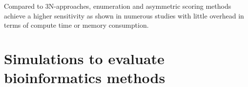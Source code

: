 \begin{table}[!ht]
\begin{center}
\begin{footnotesize}
\noindent{}
\end{footnotesize}
\end{center}
\caption[Asymmetric scoring matrix for bisulfite conversions as implemented in BiSS]{\textbf{Asymmetric scoring matrix for bisulfite conversions as implemented in BiSS.} In addition to base identity treated as a match with a score of 4, also C$>$T and G$>$A (reverse complement C$>$T) are treated as matches with a score of 4 since these conversion occur during bisulfite treatment. All other combinations are treated as mismatches and penalized with -2.}
\label{tab:bissscoring}
\end{table}

Compared to 3N-approaches, enumeration and asymmetric scoring methods achieve a higher sensitivity as shown in numerous studies \citep{Chatterjee2012,Harris2010,Zhang2021,Dinh2012AdvancedArabidopsis} with little overhead in terms of compute time or memory consumption.

\clearpage

\section{Simulations to evaluate bioinformatics methods}

